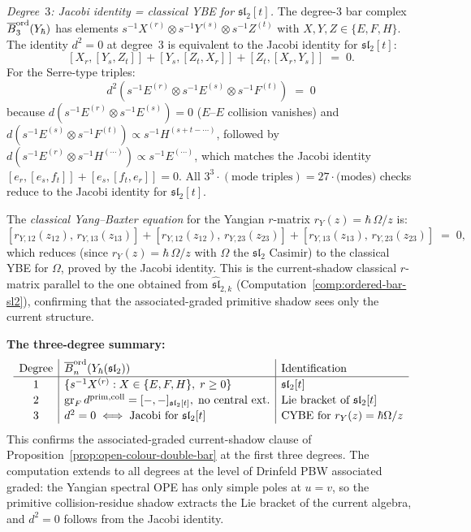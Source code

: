 \begin{computation}
\emph{Degree~$3$: Jacobi identity = classical YBE for
$\mathfrak{sl}_2[t]$.}\enspace
The degree-$3$ bar complex
$\overline{B}^{\mathrm{ord}}_3(Y_\hbar)$ has elements
$s^{-1}X^{(r)}\otimes s^{-1}Y^{(s)}\otimes s^{-1}Z^{(t)}$
with $X,Y,Z \in \{E,F,H\}$. The identity $d^2 = 0$
at degree~$3$ is equivalent to the Jacobi identity for
$\mathfrak{sl}_2[t]$:
\[
[X_r,[Y_s,Z_t]] + [Y_s,[Z_t,X_r]] + [Z_t,[X_r,Y_s]]
\;=\;0.
\]
For the Serre-type triples:
\[
d^2(s^{-1}E^{(r)}\otimes s^{-1}E^{(s)}\otimes
s^{-1}F^{(t)})
\;=\;0
\]
because $d(s^{-1}E^{(r)}\otimes s^{-1}E^{(s)}) = 0$
($E$--$E$ collision vanishes) and
$d(s^{-1}E^{(s)}\otimes s^{-1}F^{(t)})
\propto s^{-1}H^{(s+t-\cdots)}$, followed by
$d(s^{-1}E^{(r)}\otimes s^{-1}H^{(\cdots)})
\propto s^{-1}E^{(\cdots)}$, which matches the
Jacobi identity
$[e_r,[e_s,f_t]] + [e_s,[f_t,e_r]] = 0$.
All $3^3 \cdot (\text{mode triples}) = 27 \cdot
\text{(modes)}$ checks reduce to the Jacobi identity
for $\mathfrak{sl}_2[t]$.

The \emph{classical Yang--Baxter equation} for the
Yangian $r$-matrix
$r_Y(z) = \hbar\,\Omega/z$ is:
\[
[r_{Y,12}(z_{12}),\,r_{Y,13}(z_{13})]
+ [r_{Y,12}(z_{12}),\,r_{Y,23}(z_{23})]
+ [r_{Y,13}(z_{13}),\,r_{Y,23}(z_{23})]
\;=\;0,
\]
which reduces (since $r_Y(z) = \hbar\,\Omega/z$ with
$\Omega$ the $\mathfrak{sl}_2$ Casimir) to the
classical YBE for $\Omega$, proved by the Jacobi
identity. This is the current-shadow classical \(r\)-matrix parallel
to the one obtained from
$\widehat{\mathfrak{sl}}_{2,k}$
(Computation~\ref{comp:ordered-bar-sl2}), confirming
that the associated-graded primitive shadow sees only the current
structure.

\textbf{The three-degree summary:}
\[
\renewcommand{\arraystretch}{1.15}
\begin{array}{c|l|l}
\text{Degree}
 & \Barchord_n(Y_\hbar(\mathfrak{sl}_2))
 & \text{Identification} \\
\hline
1 & \{s^{-1}X^{(r)} : X \in \{E,F,H\},\;r\ge 0\}
 & \mathfrak{sl}_2[t] \\
2 & \operatorname{gr}_F d^{\mathrm{prim,coll}} = [-,-]_{\mathfrak{sl}_2[t]},\;\text{no central ext.}
 & \text{Lie bracket of } \mathfrak{sl}_2[t] \\
3 & d^2 = 0 \iff \text{Jacobi for } \mathfrak{sl}_2[t]
 & \text{CYBE for } r_Y(z)=\hbar\Omega/z
\end{array}
\]
This confirms the associated-graded current-shadow clause of
Proposition~\ref{prop:open-colour-double-bar} at the first three
degrees. The computation extends to all degrees at the level of
Drinfeld PBW associated graded: the Yangian spectral OPE has only
simple poles at \(u=v\), so the primitive collision-residue shadow
extracts the Lie bracket of the current algebra, and \(d^2=0\)
follows from the Jacobi identity.


\end{computation}
